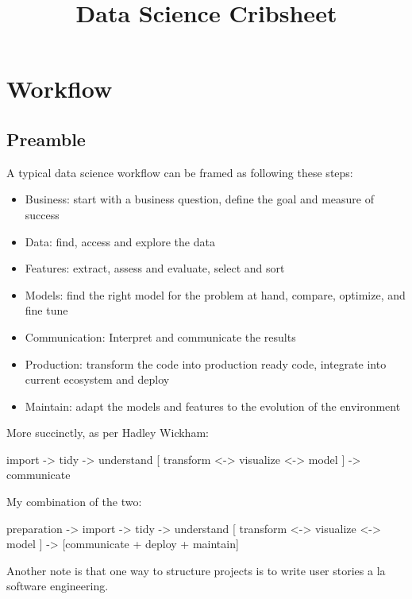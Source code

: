 \documentclass[]{book}
\title{Data Science Cribsheet}
\author{}
\date{}
\theoremstyle{definition}
\theoremstyle{definition}
\theoremstyle{definition}
\theoremstyle{remark}
\begin{document}
\maketitle

{
\setcounter{tocdepth}{1}
\tableofcontents
}
\chapter{Workflow}\label{workflow}

\section{Preamble}\label{preamble}

A typical data science workflow can be framed as following these steps:

\begin{itemize}
\item
  Business: start with a business question, define the goal and measure
  of success
\item
  Data: find, access and explore the data
\item
  Features: extract, assess and evaluate, select and sort
\item
  Models: find the right model for the problem at hand, compare,
  optimize, and fine tune
\item
  Communication: Interpret and communicate the results
\item
  Production: transform the code into production ready code, integrate
  into current ecosystem and deploy
\item
  Maintain: adapt the models and features to the evolution of the
  environment
\end{itemize}

More succinctly, as per Hadley Wickham:

import -\textgreater{} tidy -\textgreater{} understand {[} transform
\textless{}-\textgreater{} visualize \textless{}-\textgreater{} model
{]} -\textgreater{} communicate

My combination of the two:

preparation -\textgreater{} import -\textgreater{} tidy -\textgreater{}
understand {[} transform \textless{}-\textgreater{} visualize
\textless{}-\textgreater{} model {]} -\textgreater{} {[}communicate +
deploy + maintain{]}

Another note is that one way to structure projects is to write user
stories a la software engineering.
\end{document}
